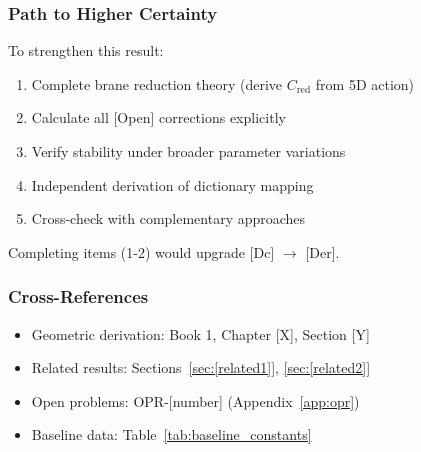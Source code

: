 
\subsubsection{Path to Higher Certainty}

To strengthen this result:
\begin{enumerate}
\item Complete brane reduction theory (derive $C_{\mathrm{red}}$ from 5D action)
\item Calculate all [Open] corrections explicitly
\item Verify stability under broader parameter variations
\item Independent derivation of dictionary mapping
\item Cross-check with complementary approaches
\end{enumerate}

Completing items (1-2) would upgrade [Dc] $\to$ [Der].


\subsubsection{Cross-References}

\begin{itemize}
\item Geometric derivation: Book 1, Chapter [X], Section [Y]
\item Related results: Sections~\ref{sec:[related1]}, \ref{sec:[related2]}
\item Open problems: OPR-[number] (Appendix~\ref{app:opr})
\item Baseline data: Table~\ref{tab:baseline_constants}
\end{itemize}


